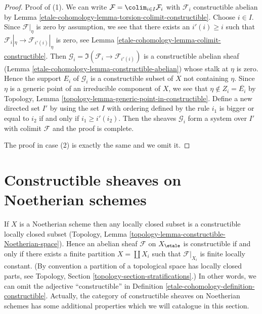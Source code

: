 \begin{proof}
Proof of (1). We can write $\mathcal{F} = \colim_{i \in I} \mathcal{F}_i$
with $\mathcal{F}_i$ constructible abelian by
Lemma \ref{etale-cohomology-lemma-torsion-colimit-constructible}.
Choose $i \in I$. Since $\mathcal{F}|_\eta$ is zero by assumption, we
see that there exists an $i'(i) \geq i$ such that
$\mathcal{F}_i|_\eta \to \mathcal{F}_{i'(i)}|_\eta$ is zero, see
Lemma \ref{etale-cohomology-lemma-colimit-constructible}.
Then $\mathcal{G}_i = \Im(\mathcal{F}_i \to \mathcal{F}_{i'(i)})$
is a constructible abelian sheaf (Lemma \ref{etale-cohomology-lemma-constructible-abelian})
whose stalk at $\eta$ is zero.
Hence the support $E_i$ of $\mathcal{G}_i$ is a constructible
subset of $X$ not containing $\eta$. Since
$\eta$ is a generic point of an irreducible component of
$X$, we see that $\eta \not \in Z_i = \overline{E_i}$ by
Topology, Lemma \ref{topology-lemma-generic-point-in-constructible}.
Define a new directed set $I'$ by using the set $I$ with
ordering defined by the rule
$i_1$ is bigger or equal to $i_2$ if and only if $i_1 \geq i'(i_2)$.
Then the sheaves $\mathcal{G}_i$ form a system over $I'$
with colimit $\mathcal{F}$ and the proof is complete.

\medskip\noindent
The proof in case (2) is exactly the same and we omit it.
\end{proof}

\section{Constructible sheaves on Noetherian schemes}
\label{etale-cohomology-section-noetherian-constructible}
If $X$ is a Noetherian scheme then any locally closed subset is a
constructible locally closed subset
(Topology, Lemma \ref{topology-lemma-constructible-Noetherian-space}).
Hence an abelian sheaf $\mathcal{F}$ on $X_\etale$ is constructible
if and only if there exists a finite partition $X = \coprod X_i$
such that $\mathcal{F}|_{X_i}$ is finite locally constant.
(By convention a partition of a topological space has locally
closed parts, see Topology, Section \ref{topology-section-stratifications}.)
In other words, we can omit the adjective ``constructible'' in
Definition \ref{etale-cohomology-definition-constructible}. Actually, the category
of constructible sheaves on
Noetherian schemes has some additional properties which we will
catalogue in this section.

